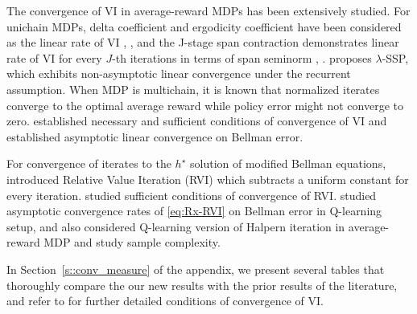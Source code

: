 \documentclass{article} %
\begin{document}
 The convergence of VI in average-reward MDPs has been extensively studied. For unichain MDPs, delta coefficient and ergodicity coefficient have been considered as the linear rate of VI \citep{seneta2006non, hubner1977improved}, \citep[Theorem~6.6.1] {10.5555/528623}, and the J-stage span contraction demonstrates linear rate of VI for every $J$-th iterations in terms of span seminorm \citep{federgruen1978contraction, van1981stochastic}, \citep[Theorem~8.5.2] {10.5555/528623}. \citet{bertsekas1998new} proposes $\lambda$-SSP, which exhibits non-asymptotic linear convergence under the recurrent assumption. When MDP is multichain, it is known that normalized iterates converge to the optimal average reward \citep[Theorem~9.4.1]{10.5555/528623} while policy error might not converge to zero. \citet{schweitzer1977asymptotic, schweitzer1979geometric} established necessary and sufficient conditions of convergence of VI and established asymptotic linear convergence on Bellman error.  


For convergence of iterates to the $h^{\star}$ solution of modified Bellman equations, \citet{white1963dynamic} introduced Relative Value Iteration (RVI) which subtracts a uniform constant for every iteration. \citet{morton1977discounting} studied sufficient conditions of convergence of RVI. \citet{bravo2024stochastic} studied asymptotic convergence rates of \ref{eq:Rx-RVI} on Bellman error in Q-learning setup, and \citet{bravostochastic} also considered Q-learning version of Halpern iteration in average-reward MDP and study sample complexity. 

In Section~\ref{s::conv_measure} of the appendix, we present several tables that thoroughly compare the our new results with the prior results of the literature, and refer to \citet{della2012illustrated} for further detailed conditions of convergence of VI. 
\end{document}
